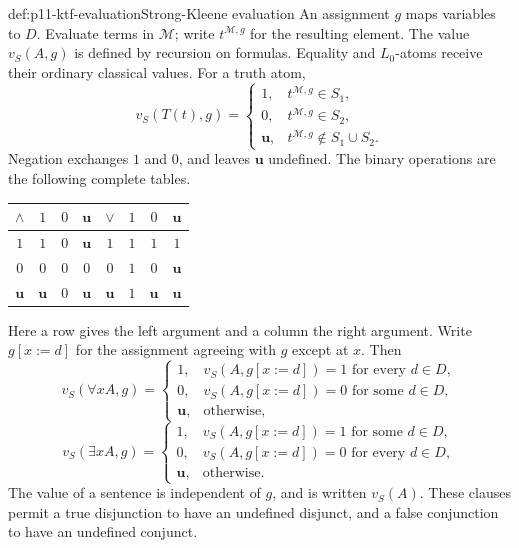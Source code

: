 \begin{hbdefinition}{def:p11-ktf-evaluation}{Strong-Kleene evaluation}
An assignment \(g\) maps variables to \(D\). Evaluate terms in
\(\mathcal M\); write \(t^{\mathcal M,g}\) for the resulting element.
The value \(v_S(A,g)\) is defined by recursion on formulas. Equality and
\(L_0\)-atoms receive their ordinary classical values. For a truth atom,
\[
 v_S(T(t),g)=
 \begin{cases}
  1,&t^{\mathcal M,g}\in S_1,\\
  0,&t^{\mathcal M,g}\in S_2,\\
  \mathbf u,&t^{\mathcal M,g}\notin S_1\cup S_2.
 \end{cases}
\]
Negation exchanges \(1\) and \(0\), and leaves \(\mathbf u\)
undefined. The binary operations are the following complete tables.
\begin{center}
\begin{tabular}{c|ccc@{\qquad\qquad}c|ccc}
\(\land\)&\(1\)&\(0\)&\(\mathbf u\)&
\(\lor\)&\(1\)&\(0\)&\(\mathbf u\)\\\hline
\(1\)&\(1\)&\(0\)&\(\mathbf u\)&
\(1\)&\(1\)&\(1\)&\(1\)\\
\(0\)&\(0\)&\(0\)&\(0\)&
\(0\)&\(1\)&\(0\)&\(\mathbf u\)\\
\(\mathbf u\)&\(\mathbf u\)&\(0\)&\(\mathbf u\)&
\(\mathbf u\)&\(1\)&\(\mathbf u\)&\(\mathbf u\)
\end{tabular}
\end{center}
Here a row gives the left argument and a column the right argument. Write
\(g[x:=d]\) for the assignment agreeing with \(g\) except at \(x\).
Then
\[
 v_S(\forall x A,g)=
 \begin{cases}
  1,&v_S(A,g[x:=d])=1\text{ for every }d\in D,\\
  0,&v_S(A,g[x:=d])=0\text{ for some }d\in D,\\
  \mathbf u,&\text{otherwise},
 \end{cases}
\]
\[
 v_S(\exists x A,g)=
 \begin{cases}
  1,&v_S(A,g[x:=d])=1\text{ for some }d\in D,\\
  0,&v_S(A,g[x:=d])=0\text{ for every }d\in D,\\
  \mathbf u,&\text{otherwise}.
 \end{cases}
\]
The value of a sentence is independent of \(g\), and is written
\(v_S(A)\). These clauses permit a true disjunction to have an undefined
disjunct, and a false conjunction to have an undefined conjunct.
\end{hbdefinition}

